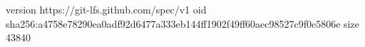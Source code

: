 version https://git-lfs.github.com/spec/v1
oid sha256:a4758e78290ea0adf92d6477a333eb144ff1902f49ff60aec98527c9f0e5806e
size 43840

